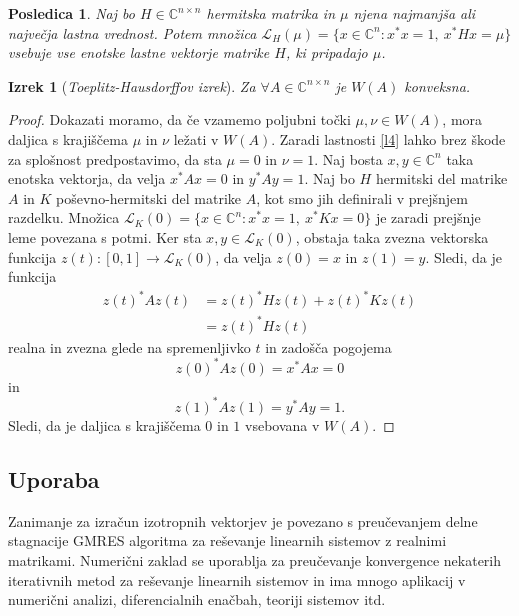 \documentclass[12pt,a4paper]{amsart}
\theoremstyle{definition}
\theoremstyle{plain}
\newtheorem{izrek}[definicija]{Izrek}
\newtheorem{posledica}[definicija]{Posledica}
\newcommand{\LH}{\mathcal{L}}
\newcommand{\C}{\mathbb C}
\begin{document}
\begin{posledica}\cite{zaloga}
Naj bo $H\in \C^{n\times n}$ hermitska matrika in $\mu$ njena najmanjša ali največja lastna vrednost. Potem množica $\LH_{H}(\mu)=\{x\in \C^n\! : x^\ast x=1,\ x^\ast Hx=\mu \}$ vsebuje vse enotske lastne vektorje matrike $H$, ki pripadajo $\mu$.
\end{posledica}

\begin{izrek}[\emph{Toeplitz-Hausdorffov izrek}]\cite{zaloga}
Za $\forall A\in \C^{n\times n}$ je $W(A)$ konveksna.
\end{izrek}

\begin{proof}
Dokazati moramo, da če vzamemo poljubni točki $\mu, \nu \in W(A)$,  mora daljica s krajiščema $\mu$ in $\nu$ ležati v $W(A)$. Zaradi lastnosti \ref{l4} lahko brez škode za splošnost predpostavimo, da sta $\mu=0$ in $\nu=1$. Naj bosta $x,y\in \C^n$ taka enotska vektorja, da velja $x^\ast Ax=0$ in $y^\ast Ay=1$. 
Naj bo $H$ hermitski del matrike $A$ in $K$ poševno-hermitski del matrike $A$, kot smo jih definirali v prejšnjem razdelku. Množica $\LH_{K}(0) =\{x\in \C^n\! : x^\ast x=1,\ x^\ast Kx=0\}$ je zaradi prejšnje leme povezana s potmi. Ker sta $x,y\in \LH_{K}(0)$, obstaja taka zvezna vektorska funkcija $z(t): [0,1] \rightarrow \LH_{K}(0)$, da velja $z(0)=x$ in $z(1)=y$.  Sledi, da je funkcija 
\begin{align*}
z(t)^\ast A z(t) &= z(t)^\ast Hz(t) +z(t)^\ast K z(t) \\
 &= z(t)^\ast Hz(t)
\end{align*}
realna in zvezna glede na spremenljivko $t$ in zadošča pogojema $$z(0)^\ast Az(0)=x^\ast Ax=0$$ in $$z(1)^\ast Az(1)=y^\ast Ay=1.$$ Sledi, da je daljica s krajiščema $0$ in $1$ vsebovana v $W(A)$.
\end{proof}

\subsection{Uporaba}
Zanimanje za izračun izotropnih vektorjev je povezano s pre\-u\-če\-va\-njem delne stagnacije GMRES algoritma za reševanje linearnih sistemov z realnimi matrikami. Numerični zaklad se uporablja za preučevanje konvergence nekaterih iterativnih metod za reševanje linearnih sistemov in ima mnogo aplikacij v numerični analizi, diferencialnih enačbah, teoriji sistemov itd.
\end{document}
